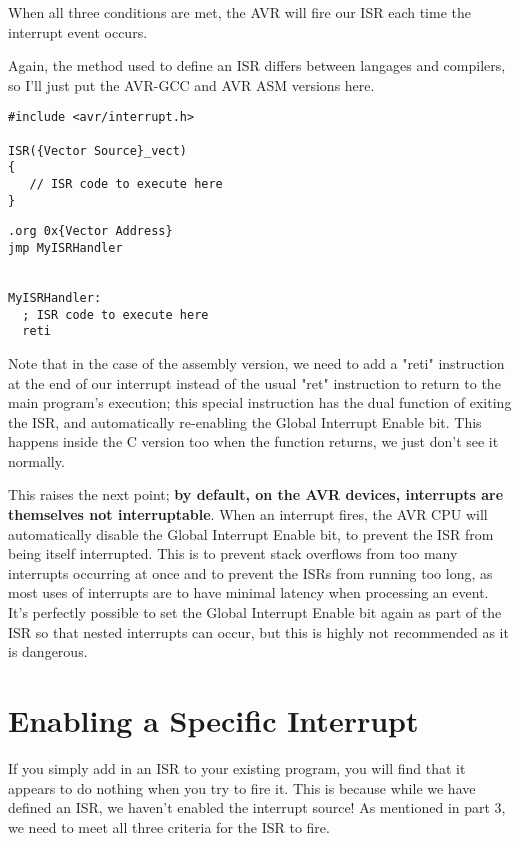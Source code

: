 \documentclass[a4paper,oneside]{book}
\begin{document}
When all three conditions are met, the AVR will fire our ISR each time the interrupt event occurs.

Again, the method used to define an ISR differs between langages and compilers, so I'll just put the AVR-GCC and AVR ASM versions here.

\begin{center}
\begin{lstlisting}
#include <avr/interrupt.h>

ISR({Vector Source}_vect)
{
   // ISR code to execute here
} 
\end{lstlisting}
\end{center}

\begin{center}
\begin{lstlisting}
.org 0x{Vector Address}
jmp MyISRHandler


MyISRHandler:
  ; ISR code to execute here
  reti 
\end{lstlisting}
\end{center}

Note that in the case of the assembly version, we need to add a "reti" instruction at the end of our interrupt instead of the usual "ret" instruction to return to the main program's execution; this special instruction has the dual function of exiting the ISR, and automatically re-enabling the Global Interrupt Enable bit. This happens inside the C version too when the function returns, we just don't see it normally.

This raises the next point; \textbf{by default, on the AVR devices, interrupts are themselves not interruptable}. When an interrupt fires, the AVR CPU will automatically disable the Global Interrupt Enable bit, to prevent the ISR from being itself interrupted. This is to prevent stack overflows from too many interrupts occurring at once and to prevent the ISRs from running too long, as most uses of interrupts are to have minimal latency when processing an event. It's perfectly possible to set the Global Interrupt Enable bit again as part of the ISR so that nested interrupts can occur, but this is highly not recommended as it is dangerous. 


\label{chp:EnableInt}
\chapter{Enabling a Specific Interrupt}

If you simply add in an ISR to your existing program, you will find that it appears to do nothing when you try to fire it. This is because while we have defined an ISR, we haven't enabled the interrupt source! As mentioned in part 3, we need to meet all three criteria for the ISR to fire.
\end{document}
